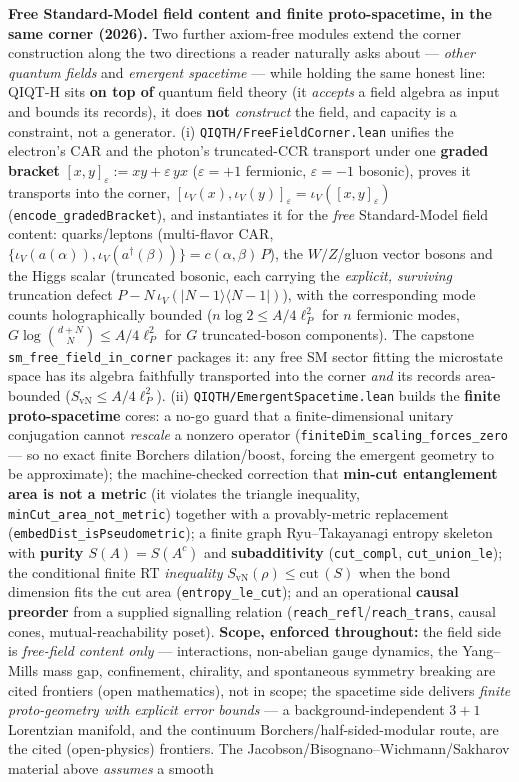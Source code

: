 \documentclass[11pt,a4paper]{article}
\begin{document}
\textbf{Free Standard-Model field content and finite proto-spacetime, in the same corner (2026).} Two further axiom-free modules extend the corner construction along the two directions a reader naturally asks about — \emph{other quantum fields} and \emph{emergent spacetime} — while holding the same honest line: QIQT-H sits \textbf{on top of} quantum field theory (it \emph{accepts} a field algebra as input and bounds its records), it does \textbf{not} \emph{construct} the field, and capacity is a constraint, not a generator. (i) \texttt{QIQTH/FreeFieldCorner.lean} unifies the electron's CAR and the photon's truncated-CCR transport under one \textbf{graded bracket} $[x,y]_\varepsilon := xy + \varepsilon\,yx$ ($\varepsilon=+1$ fermionic, $\varepsilon=-1$ bosonic), proves it transports into the corner, $[\iota_V(x),\iota_V(y)]_\varepsilon = \iota_V([x,y]_\varepsilon)$ (\texttt{encode\_gradedBracket}), and instantiates it for the \emph{free} Standard-Model field content: quarks/leptons (multi-flavor CAR, $\{\iota_V(a(\alpha)),\iota_V(a^\dagger(\beta))\}=c(\alpha,\beta)\,P$), the $W/Z$/gluon vector bosons and the Higgs scalar (truncated bosonic, each carrying the \emph{explicit, surviving} truncation defect $P-N\,\iota_V(|N{-}1\rangle\langle N{-}1|)$), with the corresponding mode counts holographically bounded ($n\log 2 \le A/4\ell_P^2$ for $n$ fermionic modes, $G\log\binom{d{+}N}{N}\le A/4\ell_P^2$ for $G$ truncated-boson components). The capstone \texttt{sm\_free\_field\_in\_corner} packages it: any free SM sector fitting the microstate space has its algebra faithfully transported into the corner \emph{and} its records area-bounded ($S_{\mathrm{vN}}\le A/4\ell_P^2$). (ii) \texttt{QIQTH/EmergentSpacetime.lean} builds the \textbf{finite proto-spacetime} cores: a no-go guard that a finite-dimensional unitary conjugation cannot \emph{rescale} a nonzero operator (\texttt{finiteDim\_scaling\_forces\_zero} — so no exact finite Borchers dilation/boost, forcing the emergent geometry to be approximate); the machine-checked correction that \textbf{min-cut entanglement area is not a metric} (it violates the triangle inequality, \texttt{minCut\_area\_not\_metric}) together with a provably-metric replacement (\texttt{embedDist\_isPseudometric}); a finite graph Ryu–Takayanagi entropy skeleton with \textbf{purity $S(A)=S(A^c)$} and \textbf{subadditivity} (\texttt{cut\_compl}, \texttt{cut\_union\_le}); the conditional finite RT \emph{inequality} $S_{\mathrm{vN}}(\rho)\le \mathrm{cut}\,(S)$ when the bond dimension fits the cut area (\texttt{entropy\_le\_cut}); and an operational \textbf{causal preorder} from a supplied signalling relation (\texttt{reach\_refl}/\texttt{reach\_trans}, causal cones, mutual-reachability poset). \textbf{Scope, enforced throughout:} the field side is \emph{free-field content only} — interactions, non-abelian gauge dynamics, the Yang–Mills mass gap, confinement, chirality, and spontaneous symmetry breaking are cited frontiers (open mathematics), not in scope; the spacetime side delivers \emph{finite proto-geometry with explicit error bounds} — a background-independent $3{+}1$ Lorentzian manifold, and the continuum Borchers/half-sided-modular route, are the cited (open-physics) frontiers. The Jacobson/Bisognano–Wichmann/Sakharov material above \emph{assumes} a smooth 
\end{document}
